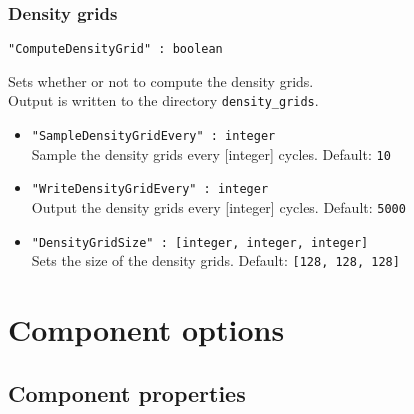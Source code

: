 \subsubsection{Density grids}
\begin{framed}
\verb+"ComputeDensityGrid" : boolean+
\end{framed}
Sets whether or not to compute the density grids.\\
Output is written to the directory \verb+density_grids+.
\begin{itemize}
\item{\verb+"SampleDensityGridEvery" : integer+}\\
Sample the density grids every [integer] cycles. Default: \verb+10+
\item{\verb+"WriteDensityGridEvery" : integer+}\\
Output the density grids every [integer] cycles. Default: \verb+5000+
\item{\verb+"DensityGridSize" : [integer, integer, integer]+}\\
Sets the size of the density grids. Default: \verb+[128, 128, 128]+
\end{itemize}



\section{Component options}

\subsection{Component properties}


